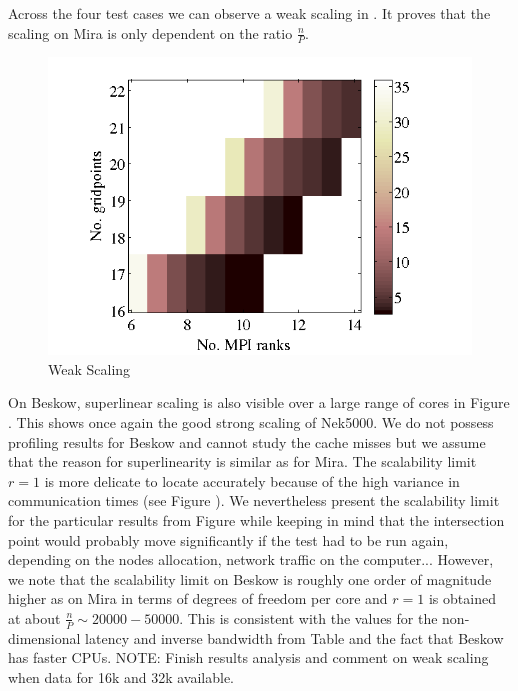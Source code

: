 \documentclass{sig-alternate}
\begin{document}
Across the four test cases we can observe a weak scaling in
. It proves that the scaling on Mira is only dependent
on the ratio $\frac{n}{P}$. 
\begin{figure}
  \centering
  \includegraphics[width=\linewidth]{./figures/weak.png}
  \caption{Weak Scaling}
  \label{fig:weakscaling}
\end{figure}


On Beskow, superlinear scaling is also visible over a large range of cores in Figure . This shows once again the good strong scaling of Nek5000. We do not possess profiling results for Beskow and cannot study the cache misses but we assume that the reason for superlinearity is similar as for Mira. The scalability limit $r=1$ is more delicate to locate accurately because of the high variance in communication times (see Figure ). We nevertheless present the scalability limit for the particular results from Figure  while keeping in mind that the intersection point would probably move significantly if the test had to be run again, depending on the nodes allocation, network traffic on the computer... However, we note that the scalability limit on Beskow is roughly one order of magnitude higher as on Mira in terms of degrees of freedom per core and $r=1$ is obtained at about $\frac{n}{P} \sim 20000 - 50000$. This is consistent with the values for the non-dimensional latency and inverse bandwidth from Table  and the fact that Beskow has faster CPUs.
NOTE: Finish results analysis and comment on weak scaling when data for 16k and 32k available.
\end{document}
